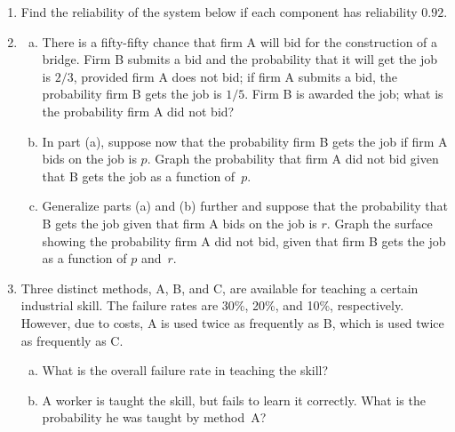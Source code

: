 \documentclass[12pt]{article}
\begin{document}
\begin{enumerate}
  \item Find the reliability of the system below if each component has reliability $0.92$.

    \begin{center}
    \end{center}

\newpage

  \item \begin{enumerate}[(a)]
      \item There is a fifty-fifty chance that firm A will bid for the construction of a bridge. Firm B submits a bid and the probability that it will get the job is $2/3$, provided firm A does not bid; if firm A submits a bid, the probability firm B gets the job is $1/5$. Firm B is awarded the job; what is the probability firm A did not bid?
      \item In part (a), suppose now that the probability firm B gets the job if firm A bids on the job is $p$. Graph the probability that firm A did not bid given that B gets the job as a function of~$p$.
      \item Generalize parts (a) and (b) further and suppose that the probability that B gets the job given that firm A bids on the job is $r$. Graph the surface showing the probability firm A did not bid, given that firm B gets the job as a function of $p$ and~$r$.
    \end{enumerate}

  \item Three distinct methods, A, B, and C, are available for teaching a certain industrial skill. The failure rates are 30\%, 20\%, and 10\%, respectively. However, due to costs, A is used twice as frequently as B, which is used twice as frequently as C.
    \begin{enumerate}[(a)]
      \item What is the overall failure rate in teaching the skill?
      \item A worker is taught the skill, but fails to learn it correctly. What is the probability he was taught by method~A?
    \end{enumerate}


\end{enumerate}
\end{document}

